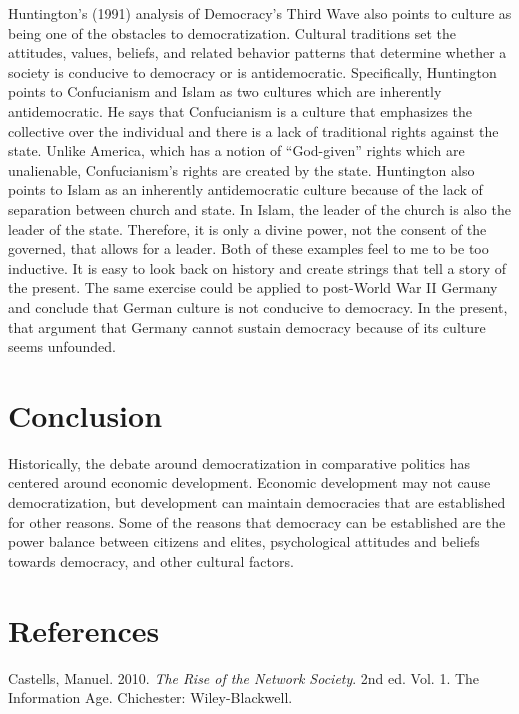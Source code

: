 \documentclass[12pt,]{article}
\begin{document}
Huntington's (1991) analysis of Democracy's Third Wave also points to
culture as being one of the obstacles to democratization. Cultural
traditions set the attitudes, values, beliefs, and related behavior
patterns that determine whether a society is conducive to democracy or
is antidemocratic. Specifically, Huntington points to Confucianism and
Islam as two cultures which are inherently antidemocratic. He says that
Confucianism is a culture that emphasizes the collective over the
individual and there is a lack of traditional rights against the state.
Unlike America, which has a notion of ``God-given'' rights which are
unalienable, Confucianism's rights are created by the state. Huntington
also points to Islam as an inherently antidemocratic culture because of
the lack of separation between church and state. In Islam, the leader of
the church is also the leader of the state. Therefore, it is only a
divine power, not the consent of the governed, that allows for a leader.
Both of these examples feel to me to be too inductive. It is easy to
look back on history and create strings that tell a story of the
present. The same exercise could be applied to post-World War II Germany
and conclude that German culture is not conducive to democracy. In the
present, that argument that Germany cannot sustain democracy because of
its culture seems unfounded.

\hypertarget{conclusion}{%
\section{Conclusion}\label{conclusion}}

Historically, the debate around democratization in comparative politics
has centered around economic development. Economic development may not
cause democratization, but development can maintain democracies that are
established for other reasons. Some of the reasons that democracy can be
established are the power balance between citizens and elites,
psychological attitudes and beliefs towards democracy, and other
cultural factors.

\hypertarget{references}{%
\section*{References}\label{references}}

\hypertarget{refs}{}
\leavevmode\hypertarget{ref-castells}{}%
Castells, Manuel. 2010. \emph{The Rise of the Network Society}. 2nd ed.
Vol. 1. The Information Age. Chichester: Wiley-Blackwell.
\end{document}
